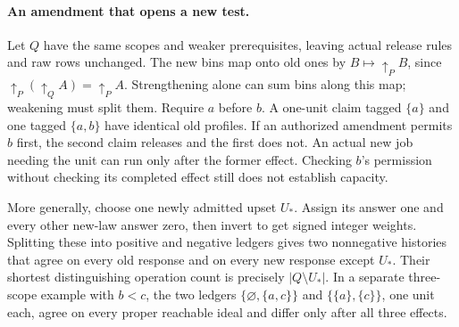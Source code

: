\documentclass[11pt]{article}
\begin{document}
\paragraph{An amendment that opens a new test.}
Let \(Q\) have the same scopes and weaker prerequisites, leaving actual release rules and raw rows unchanged. The new bins map onto old ones by \(B\mapsto\uparrow_P B\), since \(\uparrow_P(\uparrow_Q A)=\uparrow_P A\). Strengthening alone can sum bins along this map; weakening must split them. Require \(a\) before \(b\). A one-unit claim tagged \(\{a\}\) and one tagged \(\{a,b\}\) have identical old profiles. If an authorized amendment permits \(b\) first, the second claim releases and the first does not. An actual new job needing the unit can run only after the former effect. Checking \(b\)'s permission without checking its completed effect still does not establish capacity.
\par
More generally, choose one newly admitted upset \(U_*\). Assign its answer one and every other new-law answer zero, then invert to get signed integer weights. Splitting these into positive and negative ledgers gives two nonnegative histories that agree on every old response and on every new response except \(U_*\). Their shortest distinguishing operation count is precisely \(|Q\setminus U_*|\). In a separate three-scope example with \(b<c\), the two ledgers \(\{\varnothing,\{a,c\}\}\) and \(\{\{a\},\{c\}\}\), one unit each, agree on every proper reachable ideal and differ only after all three effects.
\end{document}
